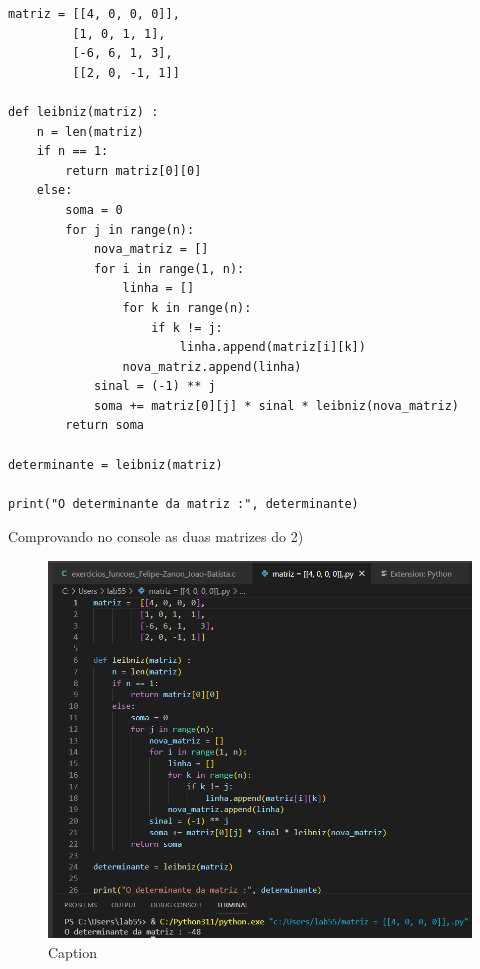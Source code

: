 \documentclass{article}
\begin{document}
\begin{lstlisting}
matriz = [[4, 0, 0, 0]],
         [1, 0, 1, 1],
         [-6, 6, 1, 3],
         [[2, 0, -1, 1]]

def leibniz(matriz) :
    n = len(matriz)
    if n == 1:
        return matriz[0][0]
    else:
        soma = 0
        for j in range(n):
            nova_matriz = []
            for i in range(1, n):
                linha = []
                for k in range(n):
                    if k != j:
                        linha.append(matriz[i][k])
                nova_matriz.append(linha)
            sinal = (-1) ** j
            soma += matriz[0][j] * sinal * leibniz(nova_matriz)
        return soma

determinante = leibniz(matriz)

print("O determinante da matriz :", determinante)
         \end{lstlisting}

Comprovando no console as duas matrizes do 2)

\begin{figure}
    \centering
    \includegraphics{Captura de tela 2023-05-09 105317.png}
    \caption{Caption}
    \label{fig:my_label}
\end{figure}
\end{document}
